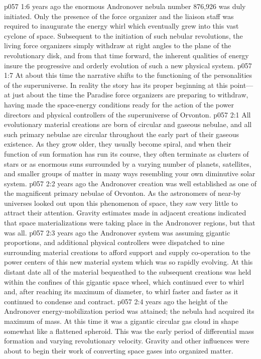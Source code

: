 \pc \vs p057 1:6  years ago the enormous Andronover nebula number 876,926 was duly initiated. Only the presence of the force organizer and the liaison staff was required to inaugurate the energy whirl which eventually grew into this vast cyclone of space. Subsequent to the initiation of such nebular revolutions, the living force organizers simply withdraw at right angles to the plane of the revolutionary disk, and from that time forward, the inherent qualities of energy insure the progressive and orderly evolution of such a new physical system.
\vs p057 1:7 At about this time the narrative shifts to the functioning of the personalities of the superuniverse. In reality the story has its proper beginning at this point---at just about the time the Paradise force organizers are preparing to withdraw, having made the space\hyp{}energy conditions ready for the action of the power directors and physical controllers of the superuniverse of Orvonton.\plusone
{}
\vs p057 2:1 All evolutionary material creations are born of circular and gaseous nebulae, and all such primary nebulae are circular throughout the early part of their gaseous existence. As they grow older, they usually become spiral, and when their function of sun formation has run its course, they often terminate as clusters of stars or as enormous suns surrounded by a varying number of planets, satellites, and smaller groups of matter in many ways resembling your own diminutive solar system.
\pc \vs p057 2:2  years ago the Andronover creation was well established as one of the magnificent primary nebulae of Orvonton. As the astronomers of near\hyp{}by universes looked out upon this phenomenon of space, they saw very little to attract their attention. Gravity estimates made in adjacent creations indicated that space materializations were taking place in the Andronover regions, but that was all.
\pc \vs p057 2:3  years ago the Andronover system was assuming gigantic proportions, and additional physical controllers were dispatched to nine surrounding material creations to afford support and supply co\hyp{}operation to the power centers of this new material system which was so rapidly evolving. At this distant date all of the material bequeathed to the subsequent creations was held within the confines of this gigantic space wheel, which continued ever to whirl and, after reaching its maximum of diameter, to whirl faster and faster as it continued to condense and contract.
\pc \vs p057 2:4  years ago the height of the Andronover energy\hyp{}mobilization period was attained; the nebula had acquired its maximum of mass. At this time it was a gigantic circular gas cloud in shape somewhat like a flattened spheroid. This was the early period of differential mass formation and varying revolutionary velocity. Gravity and other influences were about to begin their work of converting space gases into organized matter.
